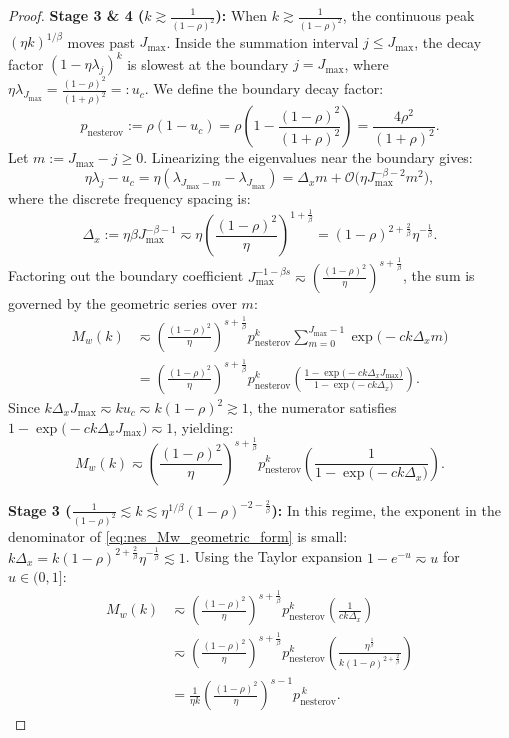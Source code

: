 \documentclass[11pt]{article}
\newcommand{\nesterov}{\mathrm{nesterov}}
\begin{document}
\begin{proof}
\medskip
\noindent\textbf{Stage 3 \& 4 ($k \gtrsim \frac{1}{(1-\rho)^2}$):}
When $k \gtrsim \frac{1}{(1-\rho)^2}$, the continuous peak $(\eta k)^{1/\beta}$ moves past $J_{\max}$. Inside the summation interval $j \le J_{\max}$, the decay factor $(1-\eta\lambda_j)^k$ is slowest at the boundary $j = J_{\max}$, where $\eta\lambda_{J_{\max}} = \frac{(1-\rho)^2}{(1+\rho)^2} =: u_c$. We define the boundary decay factor:
\[
    p_{\nesterov} := \rho(1-u_c) = \rho\left(1 - \frac{(1-\rho)^2}{(1+\rho)^2}\right) = \frac{4\rho^2}{(1+\rho)^2}.
\]
Let $m := J_{\max} - j \ge 0$. Linearizing the eigenvalues near the boundary gives:
\[
    \eta\lambda_j - u_c = \eta(\lambda_{J_{\max}-m} - \lambda_{J_{\max}}) = \Delta_x m + \mathcal{O}\bigl(\eta J_{\max}^{-\beta-2} m^2\bigr),
\]
where the discrete frequency spacing is:
\[
    \Delta_x := \eta \beta J_{\max}^{-\beta-1} \eqsim \eta \left(\frac{(1-\rho)^2}{\eta}\right)^{1+\frac{1}{\beta}} = (1-\rho)^{2+\frac{2}{\beta}} \eta^{-\frac{1}{\beta}}.
\]
Factoring out the boundary coefficient $J_{\max}^{-1-\beta s} \eqsim \left(\frac{(1-\rho)^2}{\eta}\right)^{s+\frac{1}{\beta}}$, the sum is governed by the geometric series over $m$:
\begin{align*}
    M_w(k) 
    &\eqsim \left(\frac{(1-\rho)^2}{\eta}\right)^{s+\frac{1}{\beta}} p_{\nesterov}^k \sum_{m=0}^{J_{\max}-1} \exp\bigl(-c k \Delta_x m\bigr) \\
    &= \left(\frac{(1-\rho)^2}{\eta}\right)^{s+\frac{1}{\beta}} p_{\nesterov}^k \left( \frac{1 - \exp\bigl(-c k \Delta_x J_{\max}\bigr)}{1 - \exp\bigl(-c k \Delta_x\bigr)} \right).
\end{align*}
Since $k \Delta_x J_{\max} \eqsim k u_c \eqsim k(1-\rho)^2 \gtrsim 1$, the numerator satisfies $1 - \exp\bigl(-c k \Delta_x J_{\max}\bigr) \eqsim 1$, yielding:
\begin{equation}
\label{eq:nes_Mw_geometric_form}
    M_w(k) \eqsim \left(\frac{(1-\rho)^2}{\eta}\right)^{s+\frac{1}{\beta}} p_{\nesterov}^k \left( \frac{1}{1 - \exp\bigl(-c k \Delta_x\bigr)} \right).
\end{equation}

\medskip
\noindent\textbf{Stage 3 ($\frac{1}{(1-\rho)^2} \lesssim k \lesssim \eta^{1/\beta}(1-\rho)^{-2-\frac{2}{\beta}}$):}
In this regime, the exponent in the denominator of \eqref{eq:nes_Mw_geometric_form} is small: $k \Delta_x = k (1-\rho)^{2+\frac{2}{\beta}} \eta^{-\frac{1}{\beta}} \lesssim 1$. Using the Taylor expansion $1 - e^{-u} \eqsim u$ for $u \in (0, 1]$:
\begin{align*}
    M_w(k) 
    &\eqsim \left(\frac{(1-\rho)^2}{\eta}\right)^{s+\frac{1}{\beta}} p_{\nesterov}^k \left( \frac{1}{c k \Delta_x} \right) \\
    &\eqsim \left(\frac{(1-\rho)^2}{\eta}\right)^{s+\frac{1}{\beta}} p_{\nesterov}^k \left( \frac{\eta^{\frac{1}{\beta}}}{k (1-\rho)^{2+\frac{2}{\beta}}} \right) \\
    &= \frac{1}{\eta k} \left(\frac{(1-\rho)^2}{\eta}\right)^{s-1} p_{\nesterov}^{\,k}.
\end{align*}


\end{proof}
\end{document}
